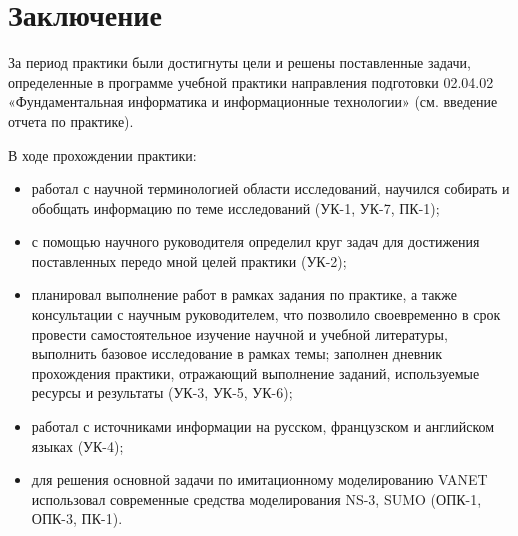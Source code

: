 \chapter*{Заключение}



За период практики были достигнуты цели и решены поставленные задачи,
определенные в программе учебной практики направления подготовки
02.04.02 «Фундаментальная информатика и информационные технологии»
(см. введение отчета по практике).

В ходе прохождении практики: 
\begin{itemize}
\item работал с научной терминологией области исследований, научился
  собирать и обобщать информацию по теме исследований (УК-1, УК-7, ПК-1);
\item с помощью научного руководителя определил круг задач для
  достижения поставленных передо мной целей практики (УК-2);
\item планировал выполнение работ в рамках задания по практике, а также
  консультации с научным руководителем, что позволило своевременно в
  срок провести самостоятельное изучение научной и учебной литературы,
  выполнить базовое исследование в рамках темы; заполнен дневник
  прохождения практики, отражающий выполнение заданий, используемые
  ресурсы и результаты (УК-3, УК-5, УК-6);
\item работал с источниками информации на русском, французском и
  английском языках (УК-4);
\item для решения основной задачи по имитационному моделированию VANET
  использовал современные средства моделирования NS-3, SUMO (ОПК-1,
  ОПК-3, ПК-1).
\end{itemize}


